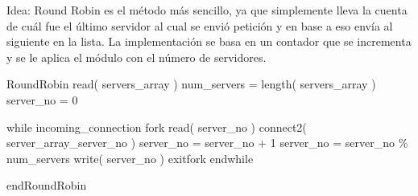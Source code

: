 
\vartriangleright Idea: Round Robin es el método más sencillo, ya que simplemente lleva la cuenta de cuál fue el último servidor al cual se envió petición
y en base a eso envía al siguiente en la lista. La implementación se basa en un contador que se incrementa y se le aplica el módulo con el número
de servidores.

\begin{code}

RoundRobin
	read( servers_array )
	num_servers = length( servers_array )
	server_no = 0
	
	while incoming_connection
		fork
			read( server_no )
			connect2( server_array_{server_no} )
			server_no = server_no + 1
			server_no = server_no \% num_servers
			write( server_no )
		exitfork
	endwhile

endRoundRobin


\end{code}